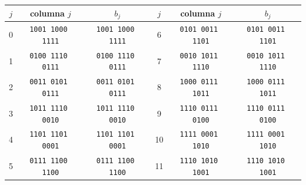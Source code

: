 \begin{tabular}{@{}ccc@{\hspace{2.5em}}ccc@{}}
\toprule
$j$ & columna $j$ & $b_j$ & $j$ & columna $j$ & $b_j$ \\
\midrule
0 & \texttt{1001\,1000\,1111} & \texttt{1001\,1000\,1111} & 6 & \texttt{0101\,0011\,1101} & \texttt{0101\,0011\,1101} \\
1 & \texttt{0100\,1110\,0111} & \texttt{0100\,1110\,0111} & 7 & \texttt{0010\,1011\,1110} & \texttt{0010\,1011\,1110} \\
2 & \texttt{0011\,0101\,0111} & \texttt{0011\,0101\,0111} & 8 & \texttt{1000\,0111\,1011} & \texttt{1000\,0111\,1011} \\
3 & \texttt{1011\,1110\,0010} & \texttt{1011\,1110\,0010} & 9 & \texttt{1110\,0111\,0100} & \texttt{1110\,0111\,0100} \\
4 & \texttt{1101\,1101\,0001} & \texttt{1101\,1101\,0001} & 10 & \texttt{1111\,0001\,1010} & \texttt{1111\,0001\,1010} \\
5 & \texttt{0111\,1100\,1100} & \texttt{0111\,1100\,1100} & 11 & \texttt{1110\,1010\,1001} & \texttt{1110\,1010\,1001} \\
\bottomrule
\end{tabular}
